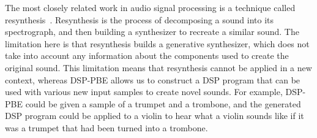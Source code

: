 The most closely related work in audio signal processing is a technique called resynthesis~\cite{masri1996improved}.
Resynthesis is the process of decomposing a sound into its spectrograph, and then building a synthesizer to recreate a similar sound.
The limitation here is that resynthesis builds a generative synthesizer, which does not take into account any information about the components used to create the original sound.
This limitation means that resynthesis cannot be applied in a new context, whereas DSP-PBE allows us to construct a DSP program that can be used with various new input samples to create novel sounds. 
For example, DSP-PBE could be given a sample of a trumpet and a trombone, and the generated DSP program could be applied to a violin to hear what a violin sounds like if it was a trumpet that had been turned into a trombone.
